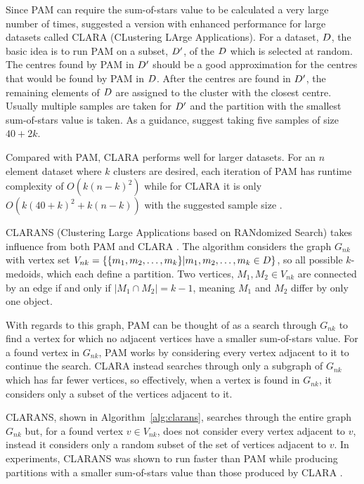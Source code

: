Since PAM can require the sum-of-stars value to be calculated a very large
number of times, \citet{kaufman2005finding} suggested a version with enhanced
performance for large datasets called CLARA (CLustering LArge Applications).
For a dataset, $D$, the basic idea is to run PAM on a subset, $D'$, of
the $D$ which is selected at random.  The centres found by PAM in $D'$
should be a good approximation for the centres that would be found by PAM in
$D$.  After the centres are found in $D'$, the remaining elements of
$D$ are assigned to the cluster with the closest centre.  Usually multiple
samples are taken for $D'$ and the partition with the smallest
sum-of-stars value is taken.  As a guidance, \citet{kaufman2005finding}
suggest taking five samples of size $40+2k$.

Compared with PAM, CLARA performs well for larger datasets.  For an $n$
element dataset where $k$ clusters are desired, each iteration of PAM has
runtime complexity of $O(k(n-k)^2)$ while for CLARA it is only $O(k(40+k)^2 +
k(n-k))$ with the suggested sample size \citep{ng2002clarans}.

CLARANS (Clustering Large Applications based on RANdomized Search) takes
influence from both PAM and CLARA \citep{ng2002clarans}.  The algorithm
considers the graph $G_{nk}$ with vertex set $V_{nk}=\{\{m_1,m_2,\dotsc,m_k\}
| m_1,m_2,\dotsc,m_k \in D\}$, so all possible $k$-medoids, which each
define a partition.  Two vertices, $M_1, M_2 \in V_{nk}$ are connected by an
edge if and only if $|M_1 \cap M_2| = k-1$, meaning $M_1$ and $M_2$ differ by
only one object.

With regards to this graph, PAM can be thought of as a search through $G_{nk}$
to find a vertex for which no adjacent vertices have a smaller sum-of-stars
value.  For a found vertex in $G_{nk}$, PAM works by considering every vertex
adjacent to it to continue the search.  CLARA instead searches through only a
subgraph of $G_{nk}$ which has far fewer vertices, so effectively, when a
vertex is found in $G_{nk}$, it considers only a subset of the vertices
adjacent to it.

CLARANS, shown in Algorithm~\ref{alg:clarans}, searches through the entire
graph $G_{nk}$ but, for a found vertex $v \in V_{nk}$, does not consider every
vertex adjacent to $v$, instead it considers only a random subset of the set
of vertices adjacent to $v$.  In experiments, CLARANS was shown to run faster
than PAM while producing partitions with a smaller sum-of-stars value than
those produced by CLARA \citep{ng2002clarans}.


